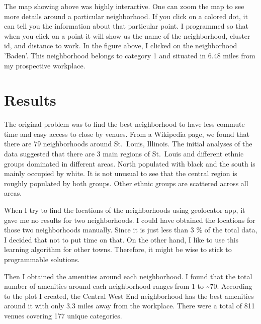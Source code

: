 \documentclass[11pt]{article}
\begin{document}
\begin{center}
    \end{center}
    
The map showing above was highly interactive. One can zoom the map to see more details around a particular neighborhood. If you click on a colored dot, it can tell you the information about that particular point. I programmed so that when you click on a point it will show us the name of the neighborhood, cluster id, and distance to work. In the figure above, I clicked on the neighborhood 'Baden'. This neighborhood belongs to category 1 and situated in 6.48 miles from my prospective workplace.
    
\newpage
            
    \hypertarget{results}{%
\section{Results}\label{results}}

The original problem was to find the best neighborhood to have less
commute time and easy access to close by venues. From a Wikipedia page,
we found that there are 79 neighborhoods around St.~Louis, Illinois. The
initial analyses of the data suggested that there are 3 main regions of
St.~Louis and different ethnic groups dominated in different areas.
North populated with black and the south is mainly occupied by white. It
is not unusual to see that the central region is roughly populated by
both groups. Other ethnic groups are scattered across all areas.

When I try to find the locations of the neighborhoods using geolocator
app, it gave me no results for two neighborhoods. I could have obtained
the locations for those two neighborhoods manually. Since it is just
less than 3 \% of the total data, I decided that not to put time on
that. On the other hand, I like to use this learning algorithm for other
towns. Therefore, it might be wise to stick to programmable solutions.

Then I obtained the amenities around each neighborhood. I found that the
total number of amenities around each neighborhood ranges from 1 to
\textasciitilde{}70. According to the plot I created, the Central West
End neighborhood has the best amenities around it with only 3.3 miles
away from the workplace. There were a total of 811 venues covering 177
unique categories.
\end{document}
